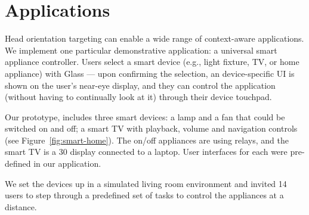 \section{Applications}
\label{sec:applications}

Head orientation targeting can enable a wide range of context-aware applications. We implement one particular demonstrative application: a universal smart appliance controller. Users select a smart device (e.g., light fixture, TV, or home appliance) with Glass --- upon confirming the selection, an device-specific UI is shown on the user's near-eye display, and they can control the application (without having to continually look at it) through their device touchpad.

Our prototype,  includes three smart devices: a lamp and a fan that could be switched on and off; a smart TV with playback, volume and navigation controls (see Figure~\ref{fig:smart-home}). The on/off appliances are using relays, and the smart TV is a 30\inch{} display connected to a laptop. User interfaces for each were pre-defined in our application.

%
We set the devices up in a simulated living room environment and invited 14 users to step through a predefined set of tasks to control the appliances at a distance.  



